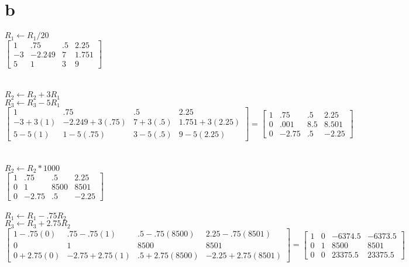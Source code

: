 \documentclass{article}
\begin{document}
\section*{b}
    $R_1 \leftarrow R_1 / 20$\\
    $\begin{bmatrix}
        1 & .75 & .5 & 2.25 \\
        -3 & -2.249 & 7 & 1.751 \\
        5 & 1 & 3 & 9
    \end{bmatrix}$\\\\\\
    $R_2 \leftarrow R_2 + 3R_1$\\
    $R_3 \leftarrow R_3 - 5R_1$\\
    $\begin{bmatrix}
        1 & .75 & .5 & 2.25 \\
        -3 + 3(1) & -2.249 + 3(.75) & 7 + 3(.5) & 1.751 + 3(2.25) \\
        5 -5(1)& 1 -5(.75) & 3 -5(.5) & 9 - 5(2.25)
    \end{bmatrix} 
    =
    \begin{bmatrix}
        1 & .75 & .5 & 2.25 \\
        0 & .001 & 8.5 & 8.501 \\
        0 & -2.75 & .5 & -2.25
    \end{bmatrix}$\\\\\\
    $R_2 \leftarrow R_2 * 1000$\\
    $\begin{bmatrix}
        1 & .75 & .5 & 2.25 \\
        0 & 1 & 8500 & 8501 \\
        0 & -2.75 & .5 & -2.25
    \end{bmatrix}$\\\\
    $R_1 \leftarrow R_1 - .75R_2$\\
    $R_3 \leftarrow R_3 + 2.75R_2$\\
    $
    \begin{bmatrix}
        1 - .75(0)& .75 - .75(1) & .5 - .75(8500) & 2.25 - .75(8501) \\
        0 & 1 & 8500 & 8501 \\
        0 + 2.75(0) & -2.75 + 2.75(1) & .5 + 2.75(8500) & -2.25 + 2.75(8501)
    \end{bmatrix}
    =
    \begin{bmatrix}
        1 & 0 & -6374.5 & -6373.5 \\
        0 & 1 & 8500 & 8501 \\
        0 & 0 & 23375.5 & 23375.5
    \end{bmatrix}$\\\\
\end{document}
